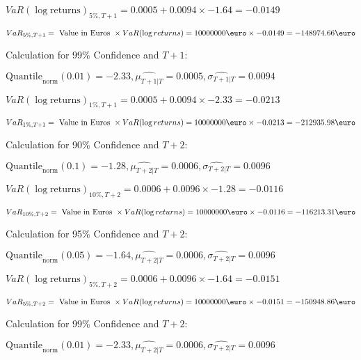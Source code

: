 \indent\indent $VaR(\log \text{returns})_{5\%, T + 1} = 0.0005 + 0.0094\times-1.64 = -0.0149$

\indent\indent $VaR_{5\%, T + 1} = \text{ Value in Euros } \times VaR(\log returns) = 10 000 000 \text{\euro} \times-0.0149 = -148974.66 \text{\euro}$\newline




Calculation for 99\% Confidence and $T+1$:

\indent\indent $\text{Quantile}_\text{norm}(0.01) = -2.33,\hat{\mu_{T+1|T}} = 0.0005, \hat{\sigma_{T+1|T}} = 0.0094$

\indent\indent $VaR(\log \text{returns})_{1\%, T + 1} = 0.0005 + 0.0094\times-2.33 = -0.0213$

\indent\indent $VaR_{1\%, T + 1} = \text{ Value in Euros } \times VaR(\log returns) = 10 000 000 \text{\euro} \times-0.0213 = -212935.98 \text{\euro}$\newline




Calculation for 90\% Confidence and $T+2$:

\indent\indent $\text{Quantile}_\text{norm}(0.1) = -1.28,\hat{\mu_{T+2|T}} = 0.0006, \hat{\sigma_{T+2|T}} = 0.0096$

\indent\indent $VaR(\log \text{returns})_{10\%, T + 2} = 0.0006 + 0.0096\times-1.28 = -0.0116$

\indent\indent $VaR_{10\%, T + 2} = \text{ Value in Euros } \times VaR(\log returns) = 10 000 000 \text{\euro} \times-0.0116 = -116213.31 \text{\euro}$\newline




Calculation for 95\% Confidence and $T+2$:

\indent\indent $\text{Quantile}_\text{norm}(0.05) = -1.64,\hat{\mu_{T+2|T}} = 0.0006, \hat{\sigma_{T+2|T}} = 0.0096$

\indent\indent $VaR(\log \text{returns})_{5\%, T + 2} = 0.0006 + 0.0096\times-1.64 = -0.0151$

\indent\indent $VaR_{5\%, T + 2} = \text{ Value in Euros } \times VaR(\log returns) = 10 000 000 \text{\euro} \times-0.0151 = -150948.86 \text{\euro}$\newline




Calculation for 99\% Confidence and $T+2$:

\indent\indent $\text{Quantile}_\text{norm}(0.01) = -2.33,\hat{\mu_{T+2|T}} = 0.0006, \hat{\sigma_{T+2|T}} = 0.0096$

